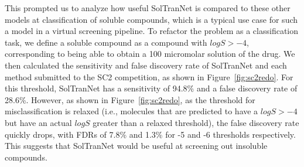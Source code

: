 \documentclass[journal=jmcmar,manuscript=article]{achemso}
\begin{document}
This prompted us to analyze how useful SolTranNet is compared to these other models at classification of soluble compounds, which is a typical use case for such a model in a virtual screening pipeline.
To refactor the problem as a classification task, we define a soluble compound as a compound with $logS > -4$, corresponding to being able to obtain a 100 micromolar solution of the drug.
We then calculated the sensitivity and false discovery rate of SolTranNet and each method submitted to the SC2 competition, as shown in Figure~\ref{fig:sc2redo}.
For this threshold, SolTranNet has a sensitivity of 94.8\% and a false discovery rate of 28.6\%.  However, as shown in Figure~\ref{fig:sc2redo}, as the threshold for misclassification is relaxed (i.e., molecules that are predicted to have a $logS > -4$ but have an actual $logS$ greater than a relaxed threshold), the false discovery rate quickly drops, with FDRs of 7.8\% and 1.3\% for -5 and -6 thresholds respectively.  This suggests that SolTranNet would be useful at screening out insoluble compounds.
\end{document}
